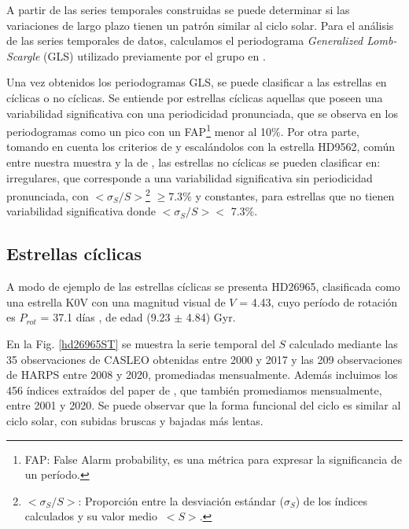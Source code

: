 \documentclass[baaa]{baaa}
\begin{document}

A partir de las series temporales construidas se puede determinar si las variaciones de largo plazo tienen un patrón similar al ciclo solar. Para el análisis de las series temporales de datos, calculamos el periodograma \textit{Generalized Lomb-Scargle} (GLS) \citep{Zechmeister09} utilizado previamente por el grupo en \cite{Ibanez19a,Ibanez19b,Ibanez20}.

Una vez obtenidos los periodogramas GLS, se puede clasificar a las estrellas en cíclicas o no cíclicas. Se entiende por estrellas cíclicas aquellas que poseen una variabilidad significativa con una periodicidad pronunciada, que se observa en los periodogramas como un pico con un FAP\footnote{FAP:
False Alarm probability, es una métrica para expresar la significancia de un período.} menor al 10\%. Por otra parte, tomando en cuenta los criterios de \cite{Baliunas95} y escalándolos con la estrella HD9562, común entre nuestra muestra y la de \cite{Baliunas95}, las estrellas no cíclicas se pueden clasificar en: irregulares, que corresponde a una variabilidad significativa sin periodicidad pronunciada, con $<\sigma_S/S>$\footnote{$<\sigma_S/S>$:
Proporción entre la desviación estándar ($\sigma_S$) de los índices calculados y su valor medio  $\ <S>$.} $\geq 7.3\%$ y constantes, para estrellas que no tienen variabilidad significativa donde $<\sigma_S/S> <$  7.3\%.

\subsection{Estrellas cíclicas}

A modo de ejemplo de las estrellas cíclicas se presenta HD26965, clasificada como una estrella K0V con una magnitud visual de $V$ = 4.43, cuyo período de rotación es $P_{rot}$ = 37.1 días \citep{Cincunegui07}, de edad (9.23 $\pm$ 4.84) Gyr.

En la Fig. \ref{hd26965ST} se muestra la serie temporal del $S$ calculado mediante las 35 observaciones de CASLEO obtenidas entre 2000 y 2017 y las 209 observaciones de HARPS entre 2008 y 2020, promediadas mensualmente. Además incluimos los 456 índices extraídos del paper de \cite{Baum22}, que también promediamos mensualmente, entre 2001 y 2020.  Se puede observar que la forma funcional del ciclo es similar al ciclo solar, con subidas bruscas y bajadas más lentas.
\end{document}
